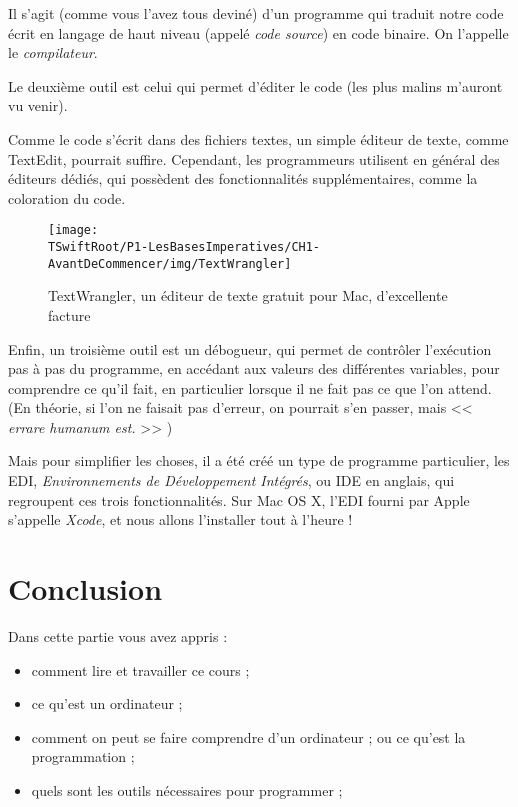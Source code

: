 Il s'agit (comme vous l'avez tous deviné) d'un programme
qui traduit notre code écrit en langage de haut niveau (appelé \emph{code source}) en code binaire.
On l'appelle le \emph{compilateur}.

%

Le deuxième outil est celui qui permet d'éditer le code (les plus malins m'auront vu venir).

Comme le code s'écrit dans des fichiers textes, un simple éditeur de texte,
comme TextEdit, pourrait suffire.
Cependant, les programmeurs utilisent en général des éditeurs dédiés,
qui possèdent des fonctionnalités supplémentaires, comme la coloration du code.
\begin{figure}[H]
\centering
\texttt{[image: \\TSwiftRoot/P1-LesBasesImperatives/CH1-AvantDeCommencer/img/TextWrangler]}
\caption{TextWrangler, un éditeur de texte gratuit pour Mac, d'excellente facture}
\end{figure}

Enfin, un troisième outil est un débogueur,
qui permet de contrôler l'exécution pas à pas du programme,
en accédant aux valeurs des différentes variables,
pour comprendre ce qu'il fait,
en particulier lorsque il ne fait pas ce que l'on attend.
(En théorie, si l'on ne faisait pas d'erreur,
on pourrait s'en passer,
mais << \emph{errare humanum est.} >> )

Mais pour simplifier les choses, il a été créé un type de programme particulier,
les EDI, \emph{Environnements de Développement Intégrés}, ou IDE en anglais,
qui regroupent ces trois fonctionnalités.
Sur Mac OS X, l'EDI fourni par Apple s'appelle \emph{Xcode},
et nous allons l'installer tout à l'heure !

\section*{Conclusion}
{}
Dans cette partie vous avez appris :
\begin{itemize}
\item comment lire et travailler ce cours ;
\item ce qu'est un ordinateur ;
\item comment on peut se faire comprendre d'un ordinateur ;
ou ce qu'est la programmation ;
\item quels sont les outils nécessaires pour programmer ;
\end{itemize}

